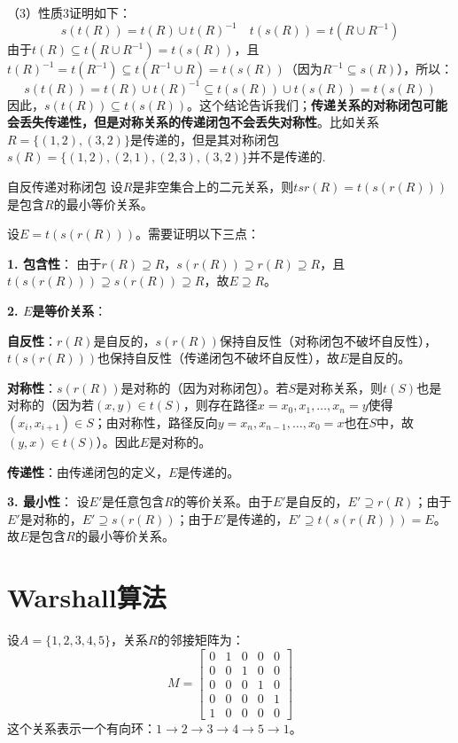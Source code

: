 \documentclass[lang=cn,11pt]{elegantbook}
\begin{document}
（3）性质3证明如下：
\[s(t(R)) = t(R) \cup t(R)^{-1} \quad
t(s(R)) = t(R \cup R^{-1}) \]
由于$t(R) \subseteq t(R \cup R^{-1}) = t(s(R))$，且$t(R)^{-1} = t(R^{-1}) \subseteq t(R^{-1} \cup R) = t(s(R))$（因为$R^{-1} \subseteq s(R)$），所以：
\[
s(t(R)) = t(R) \cup t(R)^{-1} \subseteq t(s(R)) \cup t(s(R)) = t(s(R))
\]
因此，$s(t(R)) \subseteq t(s(R))$。这个结论告诉我们；\textbf{传递关系的对称闭包可能会丢失传递性，但是对称关系的传递闭包不会丢失对称性}。比如关系$R=\{(1,2),(3,2)\}$是传递的，但是其对称闭包$s(R)=\{(1,2),(2,1),(2,3),(3,2)\}$并不是传递的.
\begin{theorem}{自反传递对称闭包}
    设$R$是非空集合上的二元关系，则$tsr(R)=t(s(r(R)))$是包含$R$的最小等价关系。
\end{theorem}
设$E = t(s(r(R)))$。需要证明以下三点：

\textbf{1. 包含性}：
由于$r(R) \supseteq R$，$s(r(R)) \supseteq r(R) \supseteq R$，且$t(s(r(R))) \supseteq s(r(R)) \supseteq R$，故$E \supseteq R$。

\textbf{2. $E$是等价关系}：

\textbf{自反性}：$r(R)$是自反的，$s(r(R))$保持自反性（对称闭包不破坏自反性），$t(s(r(R)))$也保持自反性（传递闭包不破坏自反性），故$E$是自反的。

\textbf{对称性}：$s(r(R))$是对称的（因为对称闭包）。若$S$是对称关系，则$t(S)$也是对称的（因为若$(x,y) \in t(S)$，则存在路径$x=x_0,x_1,\ldots,x_n=y$使得$(x_i,x_{i+1}) \in S$；由对称性，路径反向$y=x_n,x_{n-1},\ldots,x_0=x$也在$S$中，故$(y,x) \in t(S)$）。因此$E$是对称的。

\textbf{传递性}：由传递闭包的定义，$E$是传递的。

\textbf{3. 最小性}：
设$E'$是任意包含$R$的等价关系。由于$E'$是自反的，$E' \supseteq r(R)$；由于$E'$是对称的，$E' \supseteq s(r(R))$；由于$E'$是传递的，$E' \supseteq t(s(r(R))) = E$。故$E$是包含$R$的最小等价关系。
\section{Warshall算法}
设$A = \{1,2,3,4,5\}$，关系$R$的邻接矩阵为：
\[
M = \begin{bmatrix}
0 & 1 & 0 & 0 & 0 \\
0 & 0 & 1 & 0 & 0 \\
0 & 0 & 0 & 1 & 0 \\
0 & 0 & 0 & 0 & 1 \\
1 & 0 & 0 & 0 & 0
\end{bmatrix}
\]
这个关系表示一个有向环：$1 \to 2 \to 3 \to 4 \to 5 \to 1$。
\end{document}
